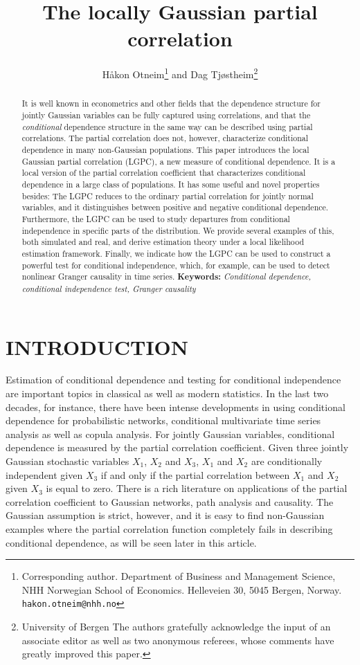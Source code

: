 \documentclass[
  12pt,
  letterpaper]{article}
\title{The locally Gaussian partial correlation}
\author{Håkon Otneim\footnote{Corresponding author. Department of Business and Management Science, NHH Norwegian School of Economics. Helleveien 30, 5045 Bergen, Norway. \texttt{hakon.otneim@nhh.no}} and Dag Tjøstheim\footnote{University of Bergen \newline {Acknowledgements:} The authors gratefully acknowledge the input of an associate editor as well as two anonymous referees, whose comments have greatly improved this paper.}}
\date{}
\theoremstyle{definition}
\theoremstyle{definition}
\theoremstyle{definition}
\theoremstyle{remark}
\begin{document}
\maketitle
\begin{abstract}
It is well known in econometrics and other fields that the dependence structure for jointly Gaussian variables can be fully captured using correlations, and that the \textit{conditional} dependence structure in the same way can be described using partial correlations. The partial correlation does not, however, characterize conditional dependence in many non-Gaussian populations. This paper introduces the local Gaussian partial correlation (LGPC), a new measure of conditional dependence. It is a local version of the partial correlation coefficient that characterizes conditional dependence in a large class of populations. It has some useful and novel properties besides: The LGPC reduces to the ordinary partial correlation for jointly normal variables, and it distinguishes between positive and negative conditional dependence. Furthermore, the LGPC can be used to study departures from conditional independence in specific parts of the distribution. We provide several examples of this, both simulated and real, and derive estimation theory under a local likelihood estimation framework. Finally, we indicate how the LGPC can be used to construct a powerful test for conditional independence, which, for example, can be used to detect nonlinear Granger causality in time series. \newline \textbf{Keywords:} \emph{Conditional dependence, conditional independence test, Granger causality}
\end{abstract}

\hypertarget{introduction}{%
\section{INTRODUCTION}\label{introduction}}

Estimation of conditional dependence and testing for conditional independence are important topics in classical as well as modern statistics. In the last two decades, for instance, there have been intense developments in using conditional dependence for probabilistic networks, conditional multivariate time series analysis as well as copula analysis. For jointly Gaussian variables, conditional dependence is measured by the partial correlation coefficient. Given three jointly Gaussian stochastic variables \(X_1\), \(X_2\) and \(X_3\), \(X_1\) and \(X_2\) are conditionally independent given \(X_3\) if and only if the partial correlation between \(X_1\) and \(X_2\) given \(X_3\) is equal to zero. There is a rich literature on applications of the partial correlation coefficient to Gaussian networks, path analysis and causality. The Gaussian assumption is strict, however, and it is easy to find non-Gaussian examples where the partial correlation function completely fails in describing conditional dependence, as will be seen later in this article.
\end{document}
